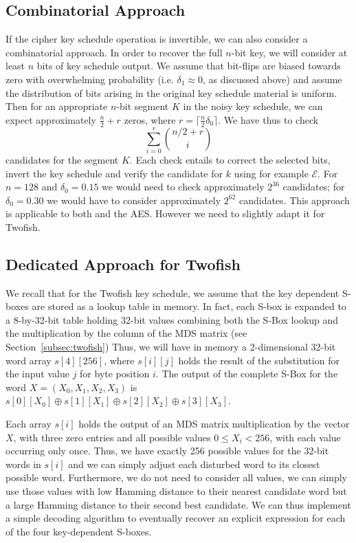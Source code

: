 \subsection{Combinatorial Approach}
If the cipher key schedule operation is invertible, we can also consider a combinatorial approach. In order to recover the full $n$-bit key, we will consider at least $n$ bits of key schedule output. We assume that bit-flips are biased towards zero with overwhelming probability (i.e. $\delta_1 \approx 0$, as discussed above) and assume the distribution of bits arising in the original key schedule material is uniform. Then for an appropriate $n$-bit segment $K$ in the noisy key schedule, we can expect approximately $\frac{n}{2} + r$ zeros, where $r = \lceil \frac{n}{2} \delta_0  \rceil$.
We have thus to check 
$$\sum_{i=0}^{r} { n/2 + r \choose i }$$ 
candidates for the segment $K$. 
Each check entails to correct the selected bits, invert the key schedule and verify the candidate for $k$ using for example $\mathcal{E}$. For $n=128$ and $\delta_0 = 0.15$ we would need to check approximately 
$2^{36}$ candidates; for $\delta_0 = 0.30$ we would have to consider approximately $2^{62}$ candidates. This approach is applicable to both \Serpent and the AES. However we need to slightly adapt it 
for Twofish.

\subsection{Dedicated Approach for Twofish}
We recall that for the Twofish key schedule, we assume that the key dependent S-boxes are stored as a lookup table in memory. In fact, each S-box is expanded to a 8-by-32-bit table holding 32-bit values combining both the S-Box lookup and the multiplication by the column of the MDS matrix (see Section~\ref{subsec:twofish}) Thus, we will have in memory a 2-dimensional 32-bit word array $s[4][256]$, where $s[i][j]$ holds the result of the substitution for the input value $j$ for byte position $i$. The output of the complete S-Box for the word $X = (X_0,X_1,X_2,X_3)$ is $s[0][X_0] \oplus s[1][X_1] \oplus s[2][X_2] \oplus s[3][X_3]$. 

Each array $s[i]$ holds the output of an MDS matrix multiplication by the vector $X$, with three zero entries and all possible values $0 \leq X_i < 256$, with each value occurring only once. 
Thus, we have exactly 256 possible values for the 32-bit words in $s[i]$ and we can simply adjust each disturbed word to its closest possible word. Furthermore, we do not need to consider all values, we can simply use those values with low Hamming distance to their nearest candidate word but a large Hamming distance to their second best candidate. We can thus implement a simple decoding algorithm to eventually recover an explicit expression for each of the four key-dependent S-boxes.

